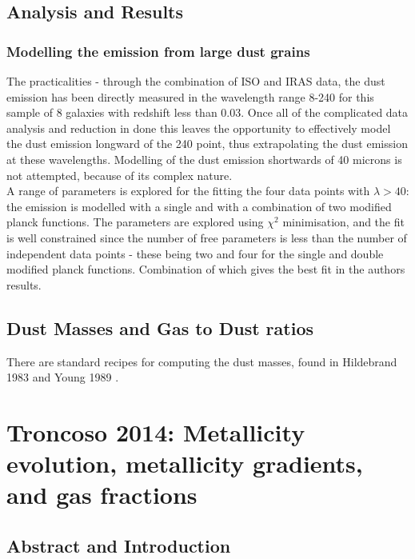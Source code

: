 \documentclass{literature}
\begin{document}
\subsection{Analysis and Results}
\subsubsection{Modelling the emission from large dust grains}
The practicalities - through the combination of ISO and IRAS data, the dust emission has been directly measured in the wavelength range 8-240 for this sample of 8 galaxies with redshift less than 0.03. Once all of the complicated data analysis and reduction in done this leaves the opportunity to effectively model the dust emission longward of the 240 point, thus extrapolating the dust emission at these wavelengths. Modelling of the dust emission shortwards of 40 microns is not attempted, because of its complex nature. \\ 
A range of parameters is explored for the fitting the four data points with $\lambda > 40$: the emission is modelled with a single and with a combination of two modified planck functions. The parameters are explored using $\chi ^{2}$ minimisation, and the fit is well constrained since the number of free parameters is less than the number of independent data points - these being two and four for the single and double modified planck functions. Combination of which gives the best fit in the authors results. 

\subsection{Dust Masses and Gas to Dust ratios}
There are standard recipes for computing the dust masses, found in Hildebrand 1983 \citep{Hildebrand_1983} and Young 1989 \citep{Young_1989}.  


\section{Troncoso 2014: Metallicity evolution, metallicity gradients, and gas fractions}\label{sec:Tronc}
\subsection{Abstract and Introduction}
\end{document}
